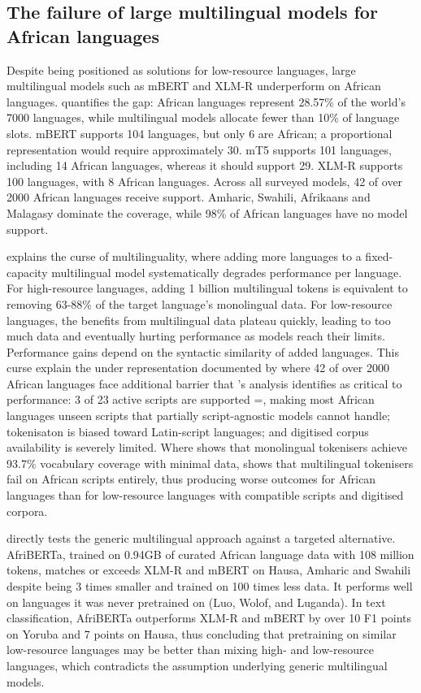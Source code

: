 \documentclass[11pt,a4paper]{article}
\begin{document}
\subsection{The failure of large multilingual models for African languages}

Despite being positioned as solutions for low-resource languages, large multilingual models such as mBERT and XLM-R underperform on African languages. \citet{hussen2025state} quantifies the gap: African languages represent 28.57\% of the world's 7000 languages, while multilingual models allocate fewer than 10\% of language slots. mBERT supports 104 languages, but only 6 are African; a proportional representation would require approximately 30. mT5 supports 101 languages, including 14 African languages, whereas it should support 29. XLM-R supports 100 languages, with 8 African languages. Across all surveyed models, 42 of over 2000 African languages receive support. Amharic, Swahili, Afrikaans and Malagasy dominate the coverage, while 98\% of African languages have no model support.

\citet{chang2024multilinguality} explains the curse of multilinguality, where adding more languages to a fixed-capacity multilingual model systematically degrades performance per language. For high-resource languages, adding 1 billion multilingual tokens is equivalent to removing 63-88\% of the target language's monolingual data. For low-resource languages, the benefits from multilingual data plateau quickly, leading to too much data and eventually hurting performance as models reach their limits. Performance gains depend on the syntactic similarity of added languages. This curse explain the under representation documented by \citet{hussen2025state} where 42 of over 2000 African languages face additional barrier that \citet{chang2024multilinguality}'s analysis identifies as critical to performance: 3 of 23 active scripts are supported =, making most African languages unseen scripts that partially script-agnostic models cannot handle; tokenisaton is biased toward Latin-script languages; and digitised corpus availability is severely limited. Where \citet{chang2024multilinguality} shows that monolingual tokenisers achieve 93.7\% vocabulary coverage with minimal data, \citet{hussen2025state} shows that multilingual tokenisers fail on African scripts entirely, thus producing worse outcomes for African languages than for low-resource languages with compatible scripts and digitised corpora.

\citet{ogueji2022afriberta} directly tests the generic multilingual approach against a targeted alternative. AfriBERTa, trained on 0.94GB of curated African language data with 108 million tokens, matches or exceeds XLM-R and mBERT on Hausa, Amharic and Swahili despite being 3 times smaller and trained on 100 times less data. It performs well on languages it was never pretrained on (Luo, Wolof, and Luganda). In text classification, AfriBERTa outperforms XLM-R and mBERT by over 10 F1 points on Yoruba and 7 points on Hausa, thus concluding that pretraining on similar low-resource languages may be better than mixing high- and low-resource languages, which contradicts the assumption underlying generic multilingual models.
\end{document}
